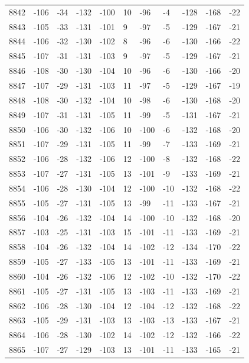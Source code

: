 \begin{table}[H]
\begin{tabular}{lllllllllll}
8842 & -106 & -34 & -132 & -100 & 10 & -96 & -4 & -128 & -168 & -22 \\
8843 & -105 & -33 & -131 & -101 & 9 & -97 & -5 & -129 & -167 & -21 \\
8844 & -106 & -32 & -130 & -102 & 8 & -96 & -6 & -130 & -166 & -22 \\
8845 & -107 & -31 & -131 & -103 & 9 & -97 & -5 & -129 & -167 & -21 \\
8846 & -108 & -30 & -130 & -104 & 10 & -96 & -6 & -130 & -166 & -20 \\
8847 & -107 & -29 & -131 & -103 & 11 & -97 & -5 & -129 & -167 & -19 \\
8848 & -108 & -30 & -132 & -104 & 10 & -98 & -6 & -130 & -168 & -20 \\
8849 & -107 & -31 & -131 & -105 & 11 & -99 & -5 & -131 & -167 & -21 \\
8850 & -106 & -30 & -132 & -106 & 10 & -100 & -6 & -132 & -168 & -20 \\
8851 & -107 & -29 & -131 & -105 & 11 & -99 & -7 & -133 & -169 & -21 \\
8852 & -106 & -28 & -132 & -106 & 12 & -100 & -8 & -132 & -168 & -22 \\
8853 & -107 & -27 & -131 & -105 & 13 & -101 & -9 & -133 & -169 & -21 \\
8854 & -106 & -28 & -130 & -104 & 12 & -100 & -10 & -132 & -168 & -22 \\
8855 & -105 & -27 & -131 & -105 & 13 & -99 & -11 & -133 & -167 & -21 \\
8856 & -104 & -26 & -132 & -104 & 14 & -100 & -10 & -132 & -168 & -20 \\
8857 & -103 & -25 & -131 & -103 & 15 & -101 & -11 & -133 & -169 & -21 \\
8858 & -104 & -26 & -132 & -104 & 14 & -102 & -12 & -134 & -170 & -22 \\
8859 & -105 & -27 & -133 & -105 & 13 & -101 & -11 & -133 & -169 & -21 \\
8860 & -104 & -26 & -132 & -106 & 12 & -102 & -10 & -132 & -170 & -22 \\
8861 & -105 & -27 & -131 & -105 & 13 & -103 & -11 & -133 & -169 & -21 \\
8862 & -106 & -28 & -130 & -104 & 12 & -104 & -12 & -132 & -168 & -22 \\
8863 & -105 & -29 & -131 & -103 & 13 & -103 & -13 & -133 & -167 & -21 \\
8864 & -106 & -28 & -130 & -102 & 14 & -102 & -12 & -132 & -166 & -22 \\
8865 & -107 & -27 & -129 & -103 & 13 & -101 & -11 & -133 & -165 & -21 \\

\end{tabular}
\end{table}
